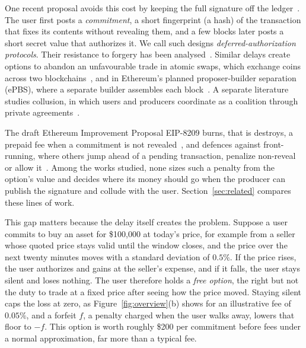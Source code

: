 \documentclass[11pt]{article}
\begin{document}
One recent proposal avoids this cost by keeping the full signature off the ledger~\cite{finlowbates2026}. The user first posts a \emph{commitment}, a short fingerprint (a hash) of the transaction that fixes its contents without revealing them, and a few blocks later posts a short secret value that authorizes it. We call such designs \emph{deferred-authorization protocols}. Their resistance to forgery has been analysed~\cite{lie2026finality}. Similar delays create options to abandon an unfavourable trade in atomic swaps, which exchange coins across two blockchains~\cite{han2019optionality}, and in Ethereum's planned proposer-builder separation (ePBS), where a separate builder assembles each block~\cite{mazorra2025epbs}. A separate literature studies collusion, in which users and producers coordinate as a coalition through private agreements~\cite{roughgarden2021tfm,chungshi2023}.

The draft Ethereum Improvement Proposal EIP-8209 burns, that is destroys, a prepaid fee when a commitment is not revealed~\cite{eip8209}, and defences against front-running, where others jump ahead of a pending transaction, penalize non-reveal or allow it~\cite{canidio2023commitment}. Among the works studied, none sizes such a penalty from the option's value and decides where its money should go when the producer can publish the signature and collude with the user. Section~\ref{sec:related} compares these lines of work.

This gap matters because the delay itself creates the problem. Suppose a user commits to buy an asset for \$100{,}000 at today's price, for example from a seller whose quoted price stays valid until the window closes, and the price over the next twenty minutes moves with a standard deviation of $0.5\%$. If the price rises, the user authorizes and gains at the seller's expense, and if it falls, the user stays silent and loses nothing. The user therefore holds a \emph{free option}, the right but not the duty to trade at a fixed price after seeing how the price moved. Staying silent caps the loss at zero, as Figure~\ref{fig:overview}(b) shows for an illustrative fee of $0.05\%$, and a forfeit $f$, a penalty charged when the user walks away, lowers that floor to $-f$. This option is worth roughly \$200 per commitment before fees under a normal approximation, far more than a typical fee.
\end{document}
